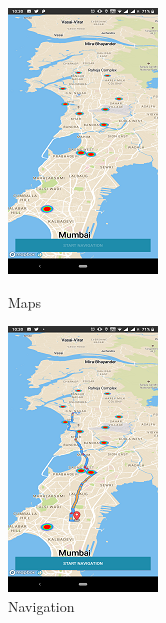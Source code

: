 \documentclass{article}
\begin{document}
\begin{flushleft}
\begin{figure}[!h]
	\begin{minipage}[t]{4cm}
		\centering
		\includegraphics[scale=1]{Maps.png}
		\caption{Maps }
	\end{minipage}
	\hspace{3cm}
	\begin{minipage}[t]{4cm}
		\centering
		\includegraphics[scale=1]{Navigation.png}
		\caption{Navigation}
	\end{minipage}
	

\end{figure}
\end{flushleft}
\end{document}
